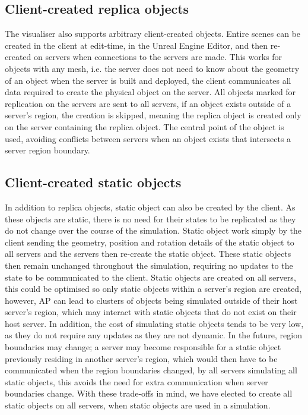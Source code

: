 \subsection{Client-created replica objects}
The visualiser also supports arbitrary client-created objects. Entire scenes can be created in the client at edit-time, in the Unreal Engine Editor, and then re-created on servers when connections to the servers are made. This works for objects with any mesh, i.e. the server does not need to know about the geometry of an object when the server is built and deployed, the client communicates all data required to create the physical object on the server. All objects marked for replication on the servers are sent to all servers, if an object exists outside of a server's region, the creation is skipped, meaning the replica object is created only on the server containing the replica object. The central point of the object is used, avoiding conflicts between servers when an object exists that intersects a server region boundary.

\subsection{Client-created static objects}\label{Client-CreatedReplicas}
In addition to replica objects, static object can also be created by the client. As these objects are static, there is no need for their states to be replicated as they do not change over the course of the simulation. Static object work simply by the client sending the geometry, position and rotation details of the static object to all servers and the servers then re-create the static object. These static objects then remain unchanged throughout the simulation, requiring no updates to the state to be communicated to the client. Static objects are created on all servers, this could be optimised so only static objects within a server's region are created, however, AP can lead to clusters of objects being simulated outside of their host server's region, which may interact with static objects that do not exist on their host server. In addition, the cost of simulating static objects tends to be very low, as they do not require any updates as they are not dynamic. In the future, region boundaries may change; a server may become responsible for a static object previously residing in another server's region, which would then have to be communicated when the region boundaries changed, by all servers simulating all static objects, this avoids the need for extra communication when server boundaries change. With these trade-offs in mind, we have elected to create all static objects on all servers, when static objects are used in a simulation.

